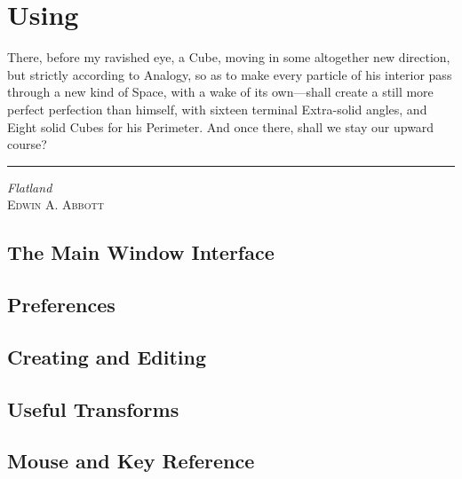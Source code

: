 \chapter{Using \dtypkgu{}}
\label{chap:using_epspline}

\ifMKwx
	\small
	There, before my ravished eye, a Cube, moving in some
	altogether new direction, but strictly according to
	Analogy, so as to make every particle of his interior
	pass through a new kind of Space, with a wake of
	its own---shall create a still more perfect
	perfection than himself, with sixteen terminal
	Extra-solid angles, and Eight solid Cubes for his
	Perimeter. And once there, shall we stay
	our upward course?\\
	\hrule%
	\textit{Flatland}\\ \textsc{Edwin A. Abbott}
	\normalsize
\else
\fi %


	\section{The Main Window Interface}%
	\label{sec:window_interface}
	

	\section{Preferences}%
	\label{sec:ch_global_prefs}
	

	\section{Creating and Editing}%
	\label{sec:creat_editing}
	

	\section{Useful Transforms}%
	\label{sec:useful_transforms}
	

	\section{Mouse and Key Reference}%
	\label{sec:mouse_key_ref}
	



